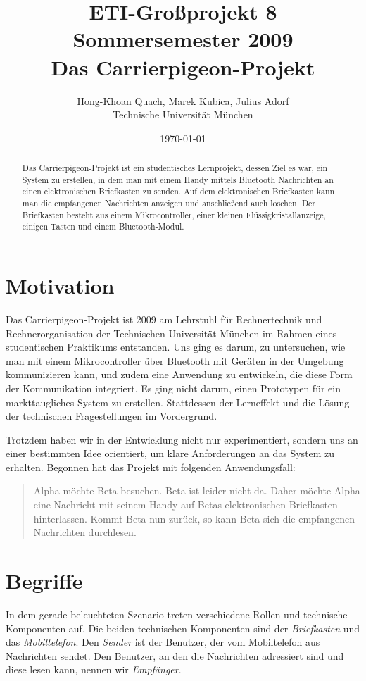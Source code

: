 \documentclass[ngerman]{article}
\author{Hong-Khoan Quach, Marek Kubica, Julius Adorf \\ Technische Universität München}
\title{ETI-Großprojekt 8\\
       Sommersemester 2009 \\
       {\bf Das Carrierpigeon-Projekt}
}
\date{\today}
\begin{document}
\maketitle

\begin{abstract}
Das Carrierpigeon-Projekt ist ein studentisches Lernprojekt, dessen Ziel es war,
ein System zu erstellen, in dem man mit einem Handy mittels Bluetooth
Nachrichten an einen elektronischen Briefkasten zu senden. Auf dem
elektronischen Briefkasten kann man die empfangenen Nachrichten anzeigen
und anschließend auch löschen. Der Briefkasten besteht aus einem Mikrocontroller,
einer kleinen Flüssig\-kristall\-an\-zeige, einigen Tasten und einem
Bluetooth-Modul.
\end{abstract}


\section{Motivation}

Das Carrierpigeon-Projekt ist 2009 am Lehrstuhl für Rechnertechnik und Rechnerorganisation der Technischen
Universität München im Rahmen eines studentischen Praktikums entstanden. Uns ging es darum,
zu untersuchen, wie man mit einem Mikrocontroller über Bluetooth mit Geräten in der Umgebung
kommunizieren kann, und zudem eine Anwendung zu entwickeln, die diese Form der Kommunikation
integriert. Es ging nicht darum, einen Prototypen für ein markttaugliches System zu erstellen.
Stattdessen der Lerneffekt und die Lösung der technischen Fragestellungen im Vordergrund.

Trotzdem haben wir in der Entwicklung nicht nur experimentiert, sondern uns an einer bestimmten
Idee orientiert, um klare Anforderungen an das System zu erhalten. Begonnen hat das Projekt mit
folgenden Anwendungsfall:
\begin{quote}

Alpha möchte Beta besuchen. Beta ist leider nicht da. Daher möchte Alpha eine Nachricht
mit seinem Handy auf Betas elektronischen Briefkasten hinterlassen. Kommt Beta nun zurück,
so kann Beta sich die empfangenen Nachrichten durchlesen.
\end{quote}

\section{Begriffe}

In dem gerade beleuchteten Szenario treten verschiedene Rollen und technische Komponenten auf.
Die beiden technischen Komponenten sind der \textit{Briefkasten} und das \textit{Mobiltelefon}.
Den \textit{Sender} ist der Benutzer, der vom Mobiltelefon aus Nachrichten sendet. Den Benutzer,
an den die Nachrichten adressiert sind und diese lesen kann, nennen wir \textit{Empfänger}.
\end{document}
